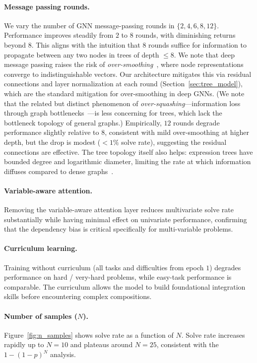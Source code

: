 \documentclass{article}
\begin{document}
\paragraph{Message passing rounds.}
We vary the number of GNN message-passing rounds in $\{2, 4, 6, 8, 12\}$.
Performance improves steadily from $2$ to $8$ rounds, with diminishing
returns beyond $8$. This aligns with the intuition that $8$ rounds suffice
for information to propagate between any two nodes in trees of depth
$\le 8$. We note that deep message passing raises the risk of
\emph{over-smoothing}~\citep{li2018deeper}, where node representations
converge to indistinguishable vectors. Our architecture mitigates this via
residual connections and layer normalization at each round (Section~\ref{sec:tree_model}),
which are the standard mitigation for over-smoothing in deep
GNNs. (We note that the related but distinct phenomenon of
\emph{over-squashing}---information loss through graph
bottlenecks~\citep{alon2021on}---is less concerning for trees, which lack
the bottleneck topology of general graphs.) Empirically, $12$ rounds
degrade performance slightly relative to
$8$, consistent with mild over-smoothing at higher depth, but the drop is
modest ($<1\%$ solve rate), suggesting the residual connections are
effective. The tree topology itself also helps: expression trees have
bounded degree and logarithmic diameter, limiting the rate at which
information diffuses compared to dense graphs~\citep{topping2022understanding}.

\paragraph{Variable-aware attention.}
Removing the variable-aware attention layer reduces multivariate solve
rate substantially while having minimal effect on univariate performance,
confirming that the dependency bias is critical specifically for
multi-variable problems.

\paragraph{Curriculum learning.}
Training without curriculum (all tasks and difficulties from epoch $1$)
degrades performance on hard / very-hard problems, while easy-task
performance is comparable. The curriculum allows the model to build
foundational integration skills before encountering complex compositions.

\paragraph{Number of samples ($N$).}
Figure~\ref{fig:n_samples} shows solve rate as a function of $N$. Solve
rate increases rapidly up to $N\!=\!10$ and plateaus around $N\!=\!25$,
consistent with the $1 - (1-p)^N$ analysis.
\end{document}
